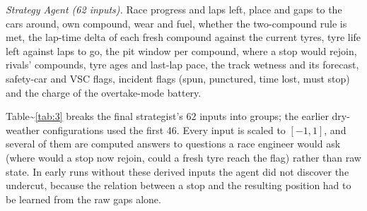 \documentclass{ieeeaccess}
\begin{document}
\emph{Strategy Agent (62 inputs).} Race progress and laps left, place and gaps to the
cars around, own compound, wear and fuel, whether the two-compound rule is met,
the lap-time delta of each fresh compound against the current tyres, tyre life
left against laps to go, the pit window per compound, where a stop would rejoin,
rivals' compounds, tyre ages and last-lap pace, the track wetness and its forecast,
safety-car and VSC flags, incident flags (spun, punctured, time lost, must stop)
and the charge of the overtake-mode battery.

Table\textasciitilde{}\ref{tab:3} breaks the final strategist's 62 inputs into groups; the earlier
dry-weather configurations used the first 46. Every input is scaled to
\([-1,1]\), and several of them are computed answers to questions a race engineer
would ask (where would a stop now rejoin, could a fresh tyre reach the flag)
rather than raw state. In early runs without these derived inputs the agent did not
discover the undercut, because the relation between a stop and the resulting
position had to be learned from the raw gaps alone.
\end{document}
